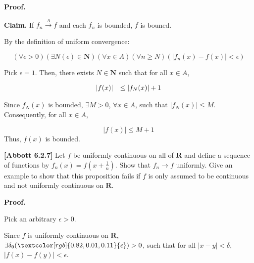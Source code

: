 \documentclass[10pt]{article}
\begin{document}
\textbf{Proof.}



\textbf{Claim. }If $\displaystyle f_{n}\xrightarrow{A} f$ and each $\displaystyle f_{n}$ is bounded, $\displaystyle f$ is bouned.



By the definition of uniform convergence:


\begin{equation*}
( \forall \epsilon  >0)( \exists N( \epsilon ) \in \mathbf{N})( \forall x\in A)( \forall n\geq N)( |f_{n}( x) -f( x) |< \epsilon )
\end{equation*}


Pick $\displaystyle \epsilon =1$. Then, there exists $\displaystyle N\in \mathbf{N}$ such that for all $\displaystyle x\in A$, 


\begin{equation*}
\begin{array}{ c l }
|f( x) | & \leq |f_{N}( x) |+1
\end{array}
\end{equation*}


Since $\displaystyle f_{N}( x)$ is bounded, $\displaystyle \exists M >0$, $\displaystyle \forall x\in A$, such that $\displaystyle |f_{N}( x) |\leq M$. Consequently, for all $\displaystyle x\in A$,


\begin{equation*}
|f( x) |\leq M+1
\end{equation*}
Thus, $\displaystyle f( x)$ is bounded.



\textbf{[Abbott 6.2.7] }Let $\displaystyle f$ be uniformly continuous on all of $\displaystyle \mathbf{R}$ and define a sequence of functions by $\displaystyle f_{n}( x) =f\left( x+\frac{1}{n}\right)$. Show that $\displaystyle f_{n}\rightarrow f$ uniformly. Give an example to show that this proposition fails if $\displaystyle f$ is only assumed to be continuous and not uniformly continuous on $\displaystyle \mathbf{R}$.



\textbf{Proof.}



Pick an arbitrary $\displaystyle \epsilon  >0$. 



Since $\displaystyle f$ is uniformly continuous on $\displaystyle \mathbf{R}$, $\displaystyle \exists \delta _{0}(\textcolor[rgb]{0.82,0.01,0.11}{\epsilon })  >0$, such that for all $\displaystyle |x-y|< \delta $, $\displaystyle |f( x) -f( y) |< \epsilon $. 
\end{document}
